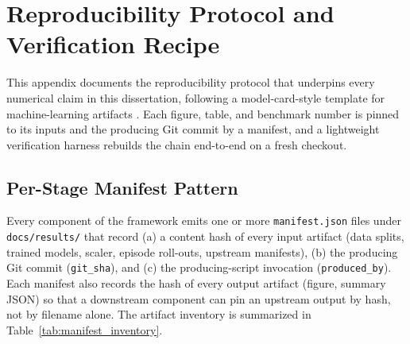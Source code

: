 
\chapter{Reproducibility Protocol and Verification Recipe}\label{app:repro}

This appendix documents the reproducibility protocol that underpins every numerical claim in this dissertation, following a model-card-style template for machine-learning artifacts \cite{Mitchell2019}. Each figure, table, and benchmark number is pinned to its inputs and the producing Git commit by a manifest, and a lightweight verification harness rebuilds the chain end-to-end on a fresh checkout.

\section{Per-Stage Manifest Pattern}\label{app:manifest_pattern}
Every component of the framework emits one or more \texttt{manifest.json} files under \texttt{docs/results/} that record (a) a content hash of every input artifact (data splits, trained models, scaler, episode roll-outs, upstream manifests), (b) the producing Git commit (\texttt{git\_sha}), and (c) the producing-script invocation (\texttt{produced\_by}). Each manifest also records the hash of every output artifact (figure, summary JSON) so that a downstream component can pin an upstream output by hash, not by filename alone. The artifact inventory is summarized in Table~\ref{tab:manifest_inventory}.

